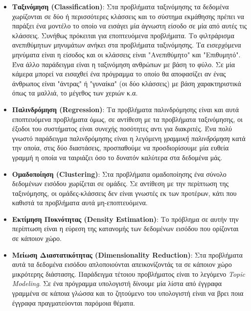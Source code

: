 \documentclass[11pt]{article} %
\numberwithin{equation}{subsection}
\begin{document}
\begin{itemize}
\item \textbf{Ταξινόμηση (Classification)}: Στα προβλήματα ταξινόμησης τα δεδομένα χωρίζονται σε δύο ή περισσότερες κλάσσεις και το σύστημα εκμάθησης πρέπει να παράξει ένα μοντέλο το οποίο να εισάγει μία άγνωστη είσοδο σε μία από αυτές τις κλάσσεις. Συνήθως πρόκειται για εποπτευόμενα προβλήματα. Το φιλτράρισμα ανεπιθύμητων μηνυμάτων ανήκει στα προβλήματα ταξινόμησης. Τα εισερχόμενα μηνύματα είναι η είσοδος και οι κλάσσεις είναι "Ανεπιθύμητο" και "Επιθυμητό". Ένα άλλο παράδειγμα είναι η ταξινόμηση ανθρώπων με βάση το φύλο. Σε μία κάμερα μπορεί να εισαχθεί ένα πρόγραμμα το οποίο θα αποφασίζει αν ένας άνθρωπος είναι "άντρας" ή "γυναίκα" (οι δύο κλάσσεις) με βάση χαρακτηριστικά όπως τα μαλλιά, το μέγεθος των χεριών κ.α.  \\
\item \textbf{Παλινδρόμηση (Regression)}: Τα προβλήματα παλινδρόμησης είναι και αυτά εποπτευόμενα προβλήματα όμως, σε αντίθεση με τα προβλήματα ταξινόμησης, οι έξοδοι του συστήματος είναι συνεχής ποσότητες αντι για διακριτές. Ένα πολύ γνωστό παράδειγμα παλινδρόμησης είναι η λεγόμενη \textit{γραμμική παλινδρόμηση} κατά την οποία, στις δύο διαστάσεις, προσπαθούμε να προσδιορίσουμε μία ευθεία γραμμή η οποία να ταιριάζει όσο το δυνατόν καλύτερα στα δεδομένα μάς. \\
 \item \textbf{Ομαδοποίηση (Clustering)}: Στα προβλήματα ομαδοποίησης ένα σύνολο δεδομένων εισόδου χωρίζεται σε ομάδες. Σε αντίθεση με την περίπτωση της ταξινόμησης, οι ομάδες-κλάσσεις δεν είναι γνωστές εκ των προτέρων, κάτι που καθιστά τα προβλήματα αυτά μη-εποπτευόμενα.\\
\item \textbf{Εκτίμηση Πυκνότητας (Density Estimation)}: Το πρόβλημα σε αυτήν την περίπτωση είναι η εύρεση της κατανομής των δεδομένων εισόδου που ορίζονται σε κάποιον χώρο.\\ 
\item \textbf{Μείωση Διαστατικότητας (Dimensionality Reduction)}: Στα προβλήματα αυτά τα δεδομένα εισόδου απλοποιούνται απεικονίζοντάς τα σε κάποιον χώρο μικρότερης διάστασης. Παράδειγμα τέτοιου προβλήματος είναι το λεγόμενο \textit{Topic Modeling}. Σε ένα πρόγραμμα υπολογιστή δίνουμε μία λίστα από έγγραφα γραμμένα σε κάποια γλώσσα και το ζητούμενο του υπολογιστή είναι να βρει ποια έγγραφα πραγματεύονται παρόμοια θέματα.
\end{itemize}


\newpage
\end{document}
